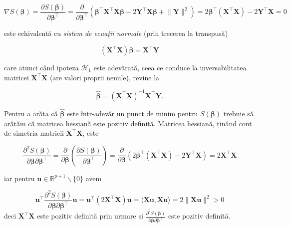 \documentclass[]{article}
\begin{document}
\[
\nabla S(\boldsymbol \beta) = \frac{\partial S(\boldsymbol \beta)}{\partial \boldsymbol \beta^\intercal} = \frac{\partial }{\partial \boldsymbol \beta^\intercal}\left(\boldsymbol \beta^\intercal \boldsymbol X^\intercal \boldsymbol X \boldsymbol\beta - 2 \boldsymbol Y^\intercal \boldsymbol X \boldsymbol\beta + \lVert  \boldsymbol Y \rVert^2\right) = 2 \boldsymbol \beta^\intercal (\boldsymbol X^\intercal \boldsymbol X)  - 2 \boldsymbol Y^\intercal \boldsymbol X = 0 
\]

este echivalentă cu \emph{sistem de ecuații normale} (prin trecerea la
transpusă)

\[
(\boldsymbol X^\intercal \boldsymbol X)\boldsymbol \beta = \boldsymbol X^\intercal\boldsymbol Y
\]

care atunci când ipoteza \(\mathcal{H}_1\) este adevărată, ceea ce
conduce la inversabilitatea matricei
\(\boldsymbol X^\intercal \boldsymbol X\) (are valori proprii nenule),
revine la

\[
\hat{\boldsymbol \beta} = (\boldsymbol X^\intercal \boldsymbol X)^{-1} \boldsymbol X^\intercal \boldsymbol Y.
\]

Pentru a arăta că \(\hat{\boldsymbol \beta}\) este într-adevăr un punct
de minim pentru \(S(\boldsymbol \beta)\) trebuie să arătăm că matricea
hessiană este pozitiv definită. Matricea hessiană, ținând cont de
simetria matricii \(\boldsymbol X^\intercal \boldsymbol X\), este

\[
  \frac{\partial^2 S(\boldsymbol \beta)}{\partial \boldsymbol \beta\partial \boldsymbol \beta^\intercal} = \frac{\partial}{\partial \boldsymbol \beta}\left(\frac{\partial S(\boldsymbol \beta)}{\partial \boldsymbol \beta^\intercal}\right) = \frac{\partial}{\partial \boldsymbol \beta}\left(2 \boldsymbol \beta^\intercal (\boldsymbol X^\intercal \boldsymbol X)  - 2 \boldsymbol Y^\intercal \boldsymbol X\right) =  2 \boldsymbol X^\intercal \boldsymbol X
\]

iar pentru \(\boldsymbol u\in\mathbb{R}^{p+1}\backslash\{0\}\) avem

\[
  \boldsymbol u^\intercal \frac{\partial^2 S(\boldsymbol \beta)}{\partial \boldsymbol \beta\partial \boldsymbol \beta^\intercal} \boldsymbol u = \boldsymbol u^\intercal \left(2 \boldsymbol X^\intercal \boldsymbol X\right) \boldsymbol u  = \langle \boldsymbol X\boldsymbol u, \boldsymbol X\boldsymbol u\rangle = 2\lVert \boldsymbol X\boldsymbol u\rVert^2 > 0
\] deci \(\boldsymbol X^\intercal \boldsymbol X\) este pozitiv definită
prin urmare și
\(\frac{\partial^2 S(\boldsymbol \beta)}{\partial \boldsymbol \beta\partial \boldsymbol \beta^\intercal}\)
este pozitiv definită.
\end{document}

